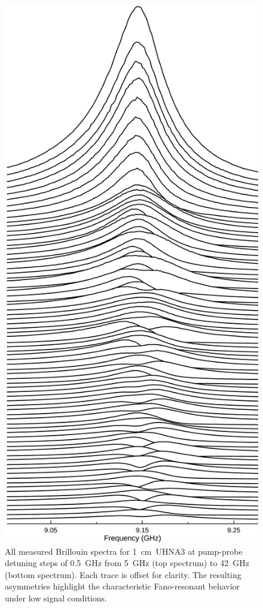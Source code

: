 \begin{figure}[ht]
\centering
\includegraphics[height=0.90\textheight]{figs/3-CoBS/JoyDivisionCoBSUHNA3.pdf}
\caption[All measured Brillouin spectra for \SI{1}{\centi\meter}~\ac{UHNA3} at pump-probe detuning steps of \SI{0.5}{\giga\hertz} from \SI{5}{\giga\hertz} to \SI{42}{\giga\hertz}.]{All measured Brillouin spectra for \SI{1}{\centi\meter}~\ac{UHNA3} at pump-probe detuning steps of \SI{0.5}{\giga\hertz} from \SI{5}{\giga\hertz} (top spectrum) to \SI{42}{\giga\hertz} (bottom spectrum). Each trace is offset for clarity. The resulting asymmetries highlight the characteristic Fano-resonant behavior under low signal conditions.}
\label{fig:Joy Division UHNA3}
\end{figure}

